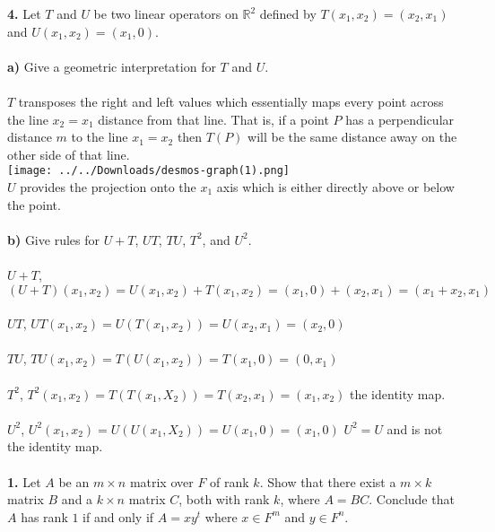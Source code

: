 \documentclass[11pt]{amsart}
\theoremstyle{definition}  %
\newcommand{\R}{\mathbb{R}}
\begin{document}
\pagebreak
\vskip 0.1cm
\noindent
{\bf 4.} Let $T$ and $U$ be two linear operators on $\R	^2$ defined by $T(x_1, x_2) = (x_2,x_1)$ and $U(x_1,x_2) = (x_1,0)$. \\ \\
{\bf a)} Give a geometric interpretation for $T$ and $U$. \\
\\
$T$ transposes the right and left values which essentially maps every point across the line $x_2=x_1$ distance from that line.  That is, if a point $P$ has a perpendicular distance $m$ to the line $x_1=x_2$ then $T(P)$ will be the same distance away on the other side of that line.\\
\texttt{[image: ../../Downloads/desmos-graph(1).png]} 
\\
$U$ provides the projection onto the $x_1$ axis which is either directly above or below the point.\\
\\
{\bf b)} Give rules for $U+T$, $UT$, $TU$, $T^2$, and $U^2$. \\
\\
$U+T$, $(U+T)(x_1,x_2) = U(x_1,x_2)+T(x_1,x_2)=(x_1,0)+(x_2,x_1) = (x_1+x_2, x_1)$ \\
\\
$UT$, $UT(x_1,x_2) = U(T(x_1,x_2))= U(x_2, x_1)=(x_2,0)$\\
\\
$TU$, $TU(x_1,x_2) = T(U(x_1,x_2))= T(x_1,0)=(0, x_1)$\\
 \\
$T^2$, $T^2(x_1,x_2)= T(T(x_1,X_2)) = T(x_2,x_1)=(x_1,x_2)$ the identity map.\\
  \\
$U^2$, $U^2(x_1,x_2)= U(U(x_1,X_2)) = U(x_1,0)=(x_1,0)$ $U^2=U$ and is not the identity map.
\\




\vfill
\eject
{}\\
{\bf 1.} Let $A$ be an $m \times n$ matrix over $F$ of rank $k$. Show that there exist a $m \times k$ matrix $B$ and a
$k \times n$ matrix $C$, both with rank $k$, where $A = BC$. Conclude that $A$ has rank $1$ if and only if $A = xy^t$ where
$x \in F^m$ and $y \in F^n$. \\
\\
\newcommand{\RANGE}{\mathrm{range}}
\newcommand{\NULL}{\mathrm{null}}
\end{document}
